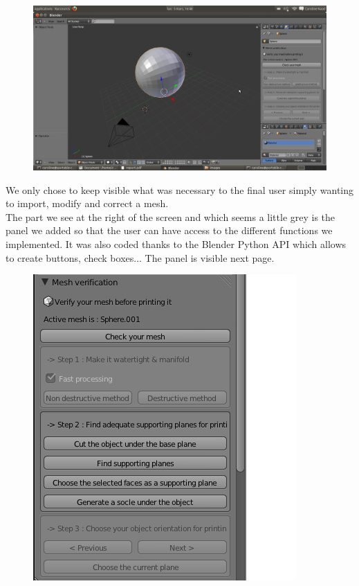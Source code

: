 \documentclass{report}
\begin{document}
\begin{figure}[!h]
\begin{center}
	\includegraphics[scale=0.3]{NotreInterface}
\end{center}
\end{figure}

\bigskip
\bigskip

We only chose to keep visible what was necessary to the final user simply wanting to import, modify and correct a mesh.\\

The part we see at the right of the screen and which seems a little grey is the panel we added so that the user can have access to the different functions we implemented. It was also coded thanks to the Blender Python API which allows to create buttons, check boxes... The panel is visible next page.

\newpage

\bigskip
\begin{figure}[!h]
\begin{center}
	\includegraphics[scale=1]{Panel}
\end{center}
\end{figure}
\bigskip
\end{document}
